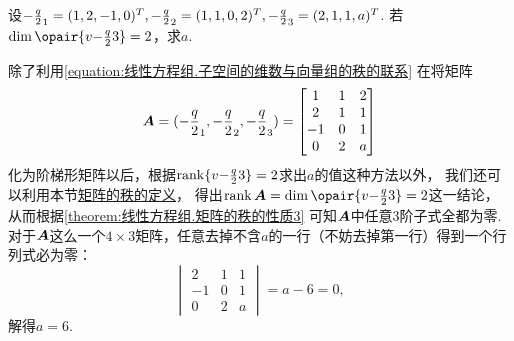 \begin{example}
设\(-\frac{q}{2}_1=(1,2,-1,0)^T,-\frac{q}{2}_2=(1,1,0,2)^T,-\frac{q}{2}_3=(2,1,1,a)^T\).
若\(\dim\opair{\v{\a}{3}}=2\)，求\(a\).
\begin{solution}
除了利用\cref{equation:线性方程组.子空间的维数与向量组的秩的联系} 在将矩阵\[
\boldsymbol{A} = (-\frac{q}{2}_1,-\frac{q}{2}_2,-\frac{q}{2}_3) = \begin{bmatrix}
1 & 1 & 2 \\
2 & 1 & 1 \\
-1 & 0 & 1 \\
0 & 2 & a
\end{bmatrix}
\]化为阶梯形矩阵以后，根据\(\rank\{v{-\frac{q}{2}}{3}\}=2\)求出\(a\)的值这种方法以外，%
我们还可以利用本节\hyperref[definition:线性方程组.矩阵的秩的定义]{矩阵的秩的定义}，%
得出\(\rank\A=\dim\opair{\v{\a}{3}}=2\)这一结论，从而根据\cref{theorem:线性方程组.矩阵的秩的性质3} 可知\(\boldsymbol{A}\)中任意3阶子式全都为零.
对于\(\boldsymbol{A}\)这么一个\(4\times3\)矩阵，任意去掉不含\(a\)的一行（不妨去掉第一行）得到一个行列式必为零：\[
\begin{vmatrix}
2 & 1 & 1 \\
-1 & 0 & 1 \\
0 & 2 & a
\end{vmatrix}
= a - 6 = 0,
\]解得\(a = 6\).
\end{solution}
\end{example}

